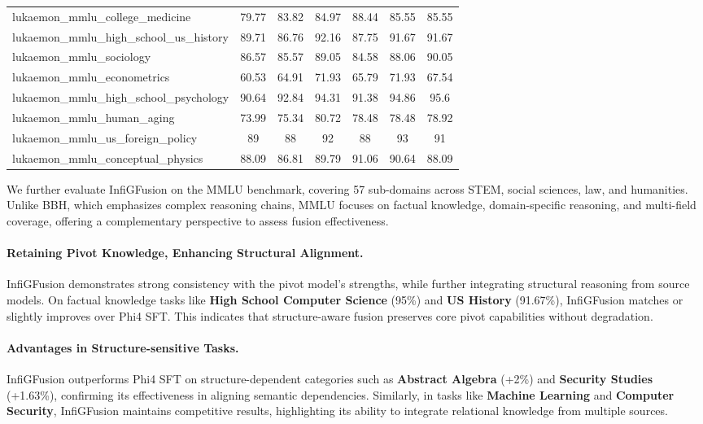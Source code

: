 \documentclass{article}
\begin{document}
\begin{table}[htp]
{\begin{tabular}{lcccc>{\columncolor{blue!10}}c>{\columncolor{blue!10}}c}
lukaemon\_mmlu\_college\_medicine                       & 79.77 & 83.82 & 84.97 & 88.44 & 85.55 & 85.55 \\
lukaemon\_mmlu\_high\_school\_us\_history               & 89.71 & 86.76 & 92.16 & 87.75 & 91.67 & 91.67 \\
lukaemon\_mmlu\_sociology                               & 86.57 & 85.57 & 89.05 & 84.58 & 88.06 & 90.05 \\
lukaemon\_mmlu\_econometrics                            & 60.53 & 64.91 & 71.93 & 65.79 & 71.93 & 67.54 \\
lukaemon\_mmlu\_high\_school\_psychology                & 90.64 & 92.84 & 94.31 & 91.38 & 94.86 & 95.6  \\
lukaemon\_mmlu\_human\_aging                            & 73.99 & 75.34 & 80.72 & 78.48 & 78.48 & 78.92 \\
lukaemon\_mmlu\_us\_foreign\_policy                     & 89    & 88    & 92    & 88    & 93    & 91    \\
lukaemon\_mmlu\_conceptual\_physics                     & 88.09 & 86.81 & 89.79 & 91.06 & 90.64 & 88.09 \\
\bottomrule
\end{tabular}}
\end{table} 


We further evaluate InfiGFusion on the MMLU benchmark, covering 57 sub-domains across STEM, social sciences, law, and humanities. Unlike BBH, which emphasizes complex reasoning chains, MMLU focuses on factual knowledge, domain-specific reasoning, and multi-field coverage, offering a complementary perspective to assess fusion effectiveness.

\paragraph{Retaining Pivot Knowledge, Enhancing Structural Alignment.}
InfiGFusion demonstrates strong consistency with the pivot model’s strengths, while further integrating structural reasoning from source models. On factual knowledge tasks like \textbf{High School Computer Science} (95\%) and \textbf{US History} (91.67\%), InfiGFusion matches or slightly improves over Phi4 SFT. This indicates that structure-aware fusion preserves core pivot capabilities without degradation.

\paragraph{Advantages in Structure-sensitive Tasks.}
InfiGFusion outperforms Phi4 SFT on structure-dependent categories such as \textbf{Abstract Algebra} (+2\%) and \textbf{Security Studies} (+1.63\%), confirming its effectiveness in aligning semantic dependencies. Similarly, in tasks like \textbf{Machine Learning} and \textbf{Computer Security}, InfiGFusion maintains competitive results, highlighting its ability to integrate relational knowledge from multiple sources.
\end{document}
